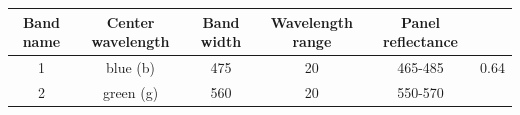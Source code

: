 \documentclass[twoside,12pt,final]{ucthesis-CA2012}
\begin{document}
\begin{ucmainmatter}
\begin{longtable}[]{@{}cccccc@{}}
\begin{minipage}[b]{0.23\columnwidth}
Band name\strut
\end{minipage} & \begin{minipage}[b]{0.14\columnwidth}\centering\strut
Center wavelength\strut
\end{minipage} & \begin{minipage}[b]{0.09\columnwidth}\centering\strut
Band width\strut
\end{minipage} & \begin{minipage}[b]{0.14\columnwidth}\centering\strut
Wavelength range\strut
\end{minipage} & \begin{minipage}[b]{0.14\columnwidth}\centering\strut
Panel reflectance\strut
\end{minipage}\tabularnewline
\midrule
\endhead
\begin{minipage}[t]{0.10\columnwidth}\centering\strut
1\strut
\end{minipage} & \begin{minipage}[t]{0.23\columnwidth}\centering\strut
blue (b)\strut
\end{minipage} & \begin{minipage}[t]{0.14\columnwidth}\centering\strut
475\strut
\end{minipage} & \begin{minipage}[t]{0.09\columnwidth}\centering\strut
20\strut
\end{minipage} & \begin{minipage}[t]{0.14\columnwidth}\centering\strut
465-485\strut
\end{minipage} & \begin{minipage}[t]{0.14\columnwidth}\centering\strut
0.64\strut
\end{minipage}\tabularnewline
\begin{minipage}[t]{0.10\columnwidth}\centering\strut
2\strut
\end{minipage} & \begin{minipage}[t]{0.23\columnwidth}\centering\strut
green (g)\strut
\end{minipage} & \begin{minipage}[t]{0.14\columnwidth}\centering\strut
560\strut
\end{minipage} & \begin{minipage}[t]{0.09\columnwidth}\centering\strut
20\strut
\end{minipage} & \begin{minipage}[t]{0.14\columnwidth}\centering\strut
550-570\strut
\end{minipage} & \begin{minipage}[t]{0.14\columnwidth}\centering\strut

\end{minipage}
\end{longtable}
\end{ucmainmatter}
\end{document}
